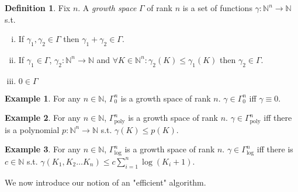 \documentclass{article}
\numberwithin{equation}{section}
\theoremstyle{definition}
\newtheorem{definition}{Definition}[section]
\newtheorem{example}{Example}[section]
\theoremstyle{plain}
\newcommand{\Nats}{\mathbb{N}}
\begin{document}
\begin{samepage}
\begin{definition}

Fix $n$. A \emph{growth space} $\Gamma$ of rank $n$ is a set of functions ${\gamma: \Nats^n \rightarrow \Nats}$ s.t.

\begin{enumerate}[(i)]

\item If $\gamma_1, \gamma_2 \in \Gamma$ then $\gamma_1 + \gamma_2 \in \Gamma$.

\item If $\gamma_1 \in \Gamma$, $\gamma_2: \Nats^n \rightarrow \Nats$ and $\forall K \in \Nats^n: \gamma_2(K) \leq \gamma_1(K)$ then $\gamma_2 \in \Gamma$.

\item $0 \in \Gamma$

\end{enumerate}

\end{definition}
\end{samepage}

\begin{example}

For any $n \in \Nats$, $\Gamma_0^n$ is a growth space of rank $n$. $\gamma \in \Gamma_0^n$ iff $\gamma \equiv 0$.

\end{example}

\begin{example}

For any $n \in \Nats$, $\Gamma_{\text{poly}}^n$ is a growth space of rank $n$. $\gamma \in \Gamma_{\text{poly}}^n$ iff there is a polynomial $p: \Nats^n \rightarrow \Nats$ s.t. $\gamma(K) \leq p(K)$.

\end{example}

\begin{example}

For any $n \in \Nats$, $\Gamma_{\text{log}}^n$ is a growth space of rank $n$. $\gamma \in \Gamma_{\text{log}}^n$ iff there is $c \in \Nats$ s.t. $\gamma(K_1, K_2 \ldots K_n) \leq c \sum_{i=1}^n \log(K_i+1)$.

\end{example}

We now introduce our notion of an "efficient" algorithm.
\end{document}
